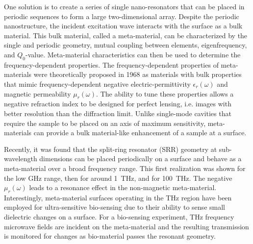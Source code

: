 One solution is to create a series of single nano-resonators that can be placed in periodic sequences to form a large two-dimensional array. Despite the periodic nanostructure, the incident excitation wave interacts with the surface as a bulk material. \cite{Yen04} This bulk material, called a meta-material, can be characterized by the single and periodic geometry, mutual coupling between elements, eigenfrequency, and $Q_0$-value. Meta-material characteristics can then be used to determine the frequency-dependent properties. The frequency-dependent properties of meta-materials were theoretically proposed in 1968 as materials with bulk properties that mimic frequency-dependent negative electric-permittivity $\epsilon_r(\omega)$ and magnetic permeability $\mu_r(\omega)$. \cite{Veselago68} The ability to tune these properties allows a negative refraction index to be designed for perfect lensing, i.e. images with better resolution than the diffraction limit. \cite{Smith04} Unlike single-mode cavities that require the sample to be placed on an axis of maximum sensitivity, meta-materials can provide a bulk material-like enhancement of a sample at a surface.

Recently, it was found that the split-ring resonator (SRR) geometry at sub-wavelength dimensions can be placed periodically on a surface and behave as a meta-material over a broad frequency range. \cite{Smith00,Yen04,Linden04} This first realization was shown for the low GHz range, \cite{Smith00} then for around 1~THz, \cite{Yen04} and for 100~THz. \cite{Linden04} The negative $\mu_r(\omega)$ leads to a resonance effect in the non-magnetic meta-material. Interestingly, meta-material surfaces operating in the THz region have been employed for ultra-sensitive bio-sensing due to their ability to sense small dielectric changes on a surface. \cite{C7NR03824K} For a bio-sensing experiment, THz frequency microwave fields are incident on the meta-material and the resulting transmission is monitored for changes as bio-material passes the resonant geometry. \cite{Lee2017}

